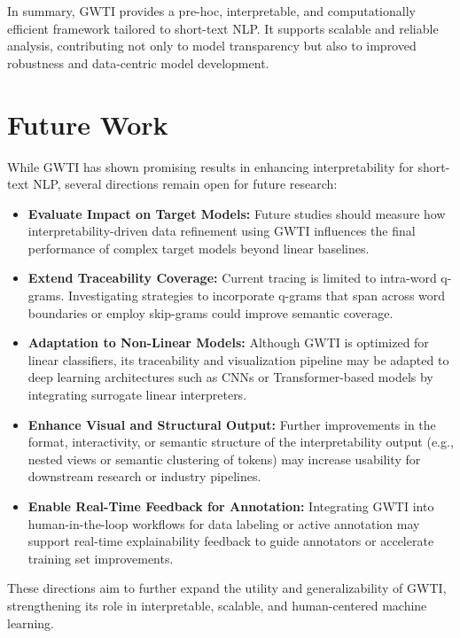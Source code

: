 \documentclass[runningheads,10pt]{llncs}
\begin{document}
In summary, \ac{GWTI} provides a pre-hoc, interpretable, and computationally efficient framework tailored to short-text NLP. It supports scalable and reliable analysis, contributing not only to model transparency but also to improved robustness and data-centric model development.

\section{Future Work}

While \ac{GWTI} has shown promising results in enhancing interpretability for short-text NLP, several directions remain open for future research:

\begin{itemize}
    \item \textbf{Evaluate Impact on Target Models:} Future studies should measure how interpretability-driven data refinement using \ac{GWTI} influences the final performance of complex target models beyond linear baselines.
    
    \item \textbf{Extend Traceability Coverage:} Current tracing is limited to intra-word q-grams. Investigating strategies to incorporate q-grams that span across word boundaries or employ skip-grams could improve semantic coverage.
    
    \item \textbf{Adaptation to Non-Linear Models:} Although \ac{GWTI} is optimized for linear classifiers, its traceability and visualization pipeline may be adapted to deep learning architectures such as CNNs or Transformer-based models by integrating surrogate linear interpreters.
    
    \item \textbf{Enhance Visual and Structural Output:} Further improvements in the format, interactivity, or semantic structure of the interpretability output (e.g., nested views or semantic clustering of tokens) may increase usability for downstream research or industry pipelines.
    
    \item \textbf{Enable Real-Time Feedback for Annotation:} Integrating \ac{GWTI} into human-in-the-loop workflows for data labeling or active annotation may support real-time explainability feedback to guide annotators or accelerate training set improvements.
\end{itemize}

These directions aim to further expand the utility and generalizability of \ac{GWTI}, strengthening its role in interpretable, scalable, and human-centered machine learning.
\end{document}
